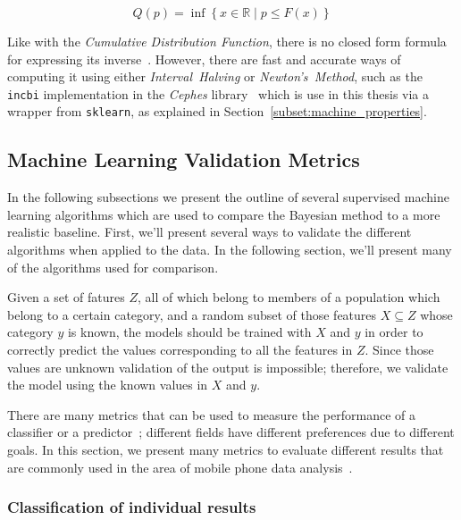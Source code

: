 \begin{equation}
\label{eq:quantile_function}
Q \left( p \right)  = \inf \left\{ x \in \mathbb{R} \mid p \leq F \left( x \right) \right\}
\end{equation}

Like with the \emph{Cumulative Distribution Function}, there is no closed form formula for expressing its inverse~\cite{kippingexoplanets2013}. However, there are fast and accurate ways of computing it using either \emph{Interval~Halving} or \emph{Newton's~Method}, such as the \texttt{incbi} implementation in the \emph{Cephes} library~\cite{cephes} which is use in this thesis via a wrapper from \texttt{sklearn}, as explained in Section~\ref{subset:machine_properties}.

\subsection{Machine Learning Validation Metrics}
\label{subsec:mlmetrics}

In the following subsections we present the outline of several supervised machine learning algorithms which are used to compare the Bayesian method to a more realistic baseline. First, we'll present several ways to validate the different algorithms when applied to the data. In the following section, we'll present many of the algorithms used for comparison.

Given a set of fatures $Z$, all of which belong to members of a population which belong to a certain category, and a random subset of those features $X \subseteq Z$ whose category $y$ is known, the models should be trained with $X$ and $y$ in order to correctly predict the values corresponding to all the features in $Z$. Since those values are unknown validation of the output is impossible; therefore, we validate the model using the known values in $X$ and $y$.

There are many metrics that can be used to measure the performance of a classifier or a predictor~\cite{binaryevaluation}; different fields have different preferences due to different goals. In this section, we present many metrics to evaluate different results that are commonly used in the area of mobile phone data analysis~\cite{oskardottir2016}.

\subsubsection{Classification of individual results}

